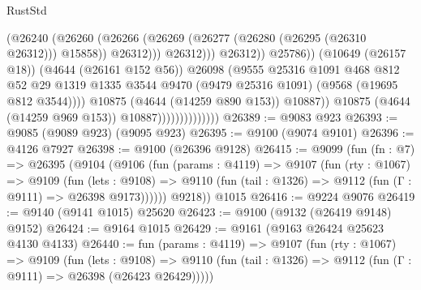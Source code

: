 \begin{lexlean}{RustStd}
\begin{coremodule}
                                                    (@26240
                                                      (@26260
                                                        (@26266
                                                          (@26269
                                                            (@26277
                                                              (@26280 (@26295 (@26310 @26312)))
                                                              @15858))
                                                          @26312)))
                                                    @26312)))
                                              @26312))
                                          @25786))
                                      (@10649 (@26157 @18))
                                      (@4644 (@26161 @152 @56))
                                      @26098
                                      (@9555
                                        @25316
                                        @1091
                                        @468
                                        @812
                                        @52
                                        @29
                                        @1319
                                        @1335
                                        @3544
                                        @9470
                                        (@9479 @25316 @1091)
                                        (@9568 (@19695 @812 @3544))))
                                    @10875
                                    (@4644 (@14259 @890 @153))
                                    @10887))
                                @10875
                                (@4644 (@14259 @969 @153))
                                @10887))))))))))))))
@26389 := @9083 @923
@26393 := @9085 (@9089 @923) (@9095 @923)
@26395 := @9100 (@9074 @9101)
@26396 := @4126 @7927
@26398 := @9100 (@26396 @9128)
@26415 := @9099
    (fun (fn : @7) =>
    @26395
      (@9104
        (@9106
          (fun (params : @4119) =>
          @9107
            (fun (rty : @1067) =>
            @9109
              (fun (lets : @9108) =>
              @9110 (fun (tail : @1326) => @9112 (fun (Γ : @9111) => @26398 @9173))))))
        @9218))
    @1015
@26416 := @9224 @9076
@26419 := @9140 (@9141 @1015) @25620
@26423 := @9100 (@9132 (@26419 @9148) @9152)
@26424 := @9164 @1015
@26429 := @9161 (@9163 @26424 @25623 @4130 @4133)
@26440 := fun (params : @4119) =>
  @9107
    (fun (rty : @1067) =>
    @9109
      (fun (lets : @9108) =>
      @9110 (fun (tail : @1326) => @9112 (fun (Γ : @9111) => @26398 (@26423 @26429)))))

\end{coremodule}
\end{lexlean}
